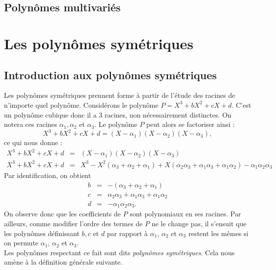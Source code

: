 \documentclass[12pt]{article}
\theoremstyle{remark}\newtheorem{note}{Note}
\theoremstyle{remark}\newtheorem{nota}{Notation}
\theoremstyle{definition}
\begin{document}
\subsection{Polynômes multivariés}






\pagebreak

\section{Les polynômes symétriques}

\subsection{Introduction aux polynômes symétriques}
Les polynômes symétriques prennent forme à partir de l'étude des racines de n'importe quel polynôme. Considérons le polynôme $P=X^3 + bX^2 + cX + d$. C'est un polynôme cubique donc il a $3$ racines, non nécessairement distinctes. On notera ces racines $\alpha_1 , \alpha_2$ et $\alpha_3$.
Le polynôme $P$ peut alors se factoriser ainsi :
$$X^3 + bX^2 + cX + d = (X - \alpha_1)(X - \alpha_2)(X - \alpha_3),$$
ce qui nous donne :
\begin{eqnarray}
X^3 + bX^2 + cX + d &=& (X - \alpha_1)(X - \alpha_2)(X - \alpha_3) \nonumber \\
X^3 + bX^2 + cX + d &=& X^3 - X^2(\alpha_3 + \alpha_2 + \alpha_1) + X(\alpha_2 \alpha_3 + \alpha_1 \alpha_3 + \alpha_1 \alpha_2) - \alpha_1 \alpha_2 \alpha_3 \nonumber
\end{eqnarray}
Par identification, on obtient 
\begin{eqnarray}
b &=& -(\alpha_3 + \alpha_2 + \alpha_1) \nonumber \\
c &=& \alpha_2 \alpha_3 + \alpha_1 \alpha_3 + \alpha_1 \alpha_2 \nonumber \\
d &=& - \alpha_1 \alpha_2 \alpha_3. \nonumber 
\end{eqnarray}
On observe donc que les coefficients de $P$ sont polynomiaux en ses racines. Par ailleurs, comme modifier l'ordre des termes de $P$ ne le change pas, il s'ensuit que les polynômes définissant $b,c$ et $d$ par rapport à $\alpha_1$, $\alpha_2$ et $\alpha_3$ restent les mêmes si on permute $\alpha_1$, $\alpha_2$ et $\alpha_3$.\\
Les polynômes respectant ce fait sont dits \textit{polynômes symétriques}. Cela nous amène à la définition générale suivante.\\
\end{document}
